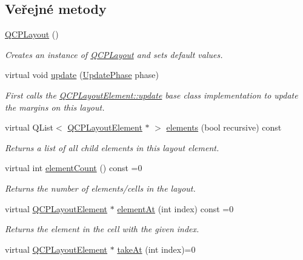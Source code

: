 \subsection*{Veřejné metody}
\begin{DoxyCompactItemize}
\item 
\hyperlink{classQCPLayout_a04222e6e1361fd802d48f1a25b7020d4}{Q\+C\+P\+Layout} ()
\begin{DoxyCompactList}\small\item\em Creates an instance of \hyperlink{classQCPLayout}{Q\+C\+P\+Layout} and sets default values. \end{DoxyCompactList}\item 
virtual void \hyperlink{classQCPLayout_a34ab477e820537ded7bade4399c482fd}{update} (\hyperlink{classQCPLayoutElement_a0d83360e05735735aaf6d7983c56374d}{Update\+Phase} phase)
\begin{DoxyCompactList}\small\item\em First calls the \hyperlink{classQCPLayoutElement_a929c2ec62e0e0e1d8418eaa802e2af9b}{Q\+C\+P\+Layout\+Element\+::update} base class implementation to update the margins on this layout. \end{DoxyCompactList}\item 
virtual Q\+List$<$ \hyperlink{classQCPLayoutElement}{Q\+C\+P\+Layout\+Element} $\ast$ $>$ \hyperlink{classQCPLayout_a51fe2675b53e829130b229bc1f7b0f99}{elements} (bool recursive) const 
\begin{DoxyCompactList}\small\item\em Returns a list of all child elements in this layout element. \end{DoxyCompactList}\item 
virtual int \hyperlink{classQCPLayout_ac2a4553f13cc91ed9eaf62d757752696}{element\+Count} () const  =0
\begin{DoxyCompactList}\small\item\em Returns the number of elements/cells in the layout. \end{DoxyCompactList}\item 
virtual \hyperlink{classQCPLayoutElement}{Q\+C\+P\+Layout\+Element} $\ast$ \hyperlink{classQCPLayout_a4115014e4c4ccbac2477405c994b2392}{element\+At} (int index) const  =0
\begin{DoxyCompactList}\small\item\em Returns the element in the cell with the given {\itshape index}. \end{DoxyCompactList}\item 
virtual \hyperlink{classQCPLayoutElement}{Q\+C\+P\+Layout\+Element} $\ast$ \hyperlink{classQCPLayout_a5a79621fa0a6eabb8b520cfc04fb601a}{take\+At} (int index)=0

\end{DoxyCompactItemize}
